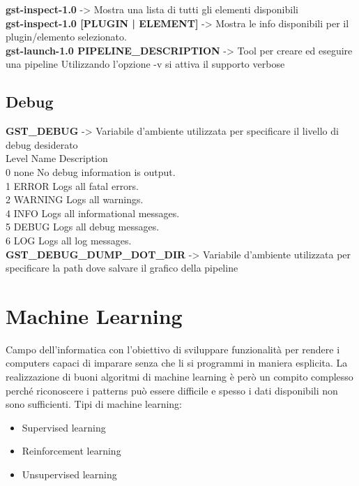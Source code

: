 \documentclass[8pt,a4paper]{article}
\begin{document}
\begin{multicols}{5}
    \textbf{gst-inspect-1.0} -> Mostra una lista di tutti gli elementi disponibili\\
    
    \textbf{gst-inspect-1.0 [PLUGIN | ELEMENT]} -> Mostra le info disponibili per il plugin/elemento selezionato.\\
    
    \textbf{gst-launch-1.0 PIPELINE\_DESCRIPTION} -> Tool per creare ed eseguire una pipeline
    Utilizzando l’opzione -v si attiva il supporto verbose\\
    
    \subsection{Debug} 
    
    \textbf{GST\_DEBUG} -> Variabile d’ambiente utilizzata per specificare il livello di debug desiderato\\
    
    Level 	Name 	Description\\
    0       none	No debug information is output.\\
    1       ERROR Logs all fatal errors.\\
    2       WARNING Logs all warnings.\\
    4       INFO 	Logs all informational messages.\\
    5       DEBUG Logs all debug messages.\\
    6       LOG   Logs all log messages.\\
    
    \textbf{GST\_DEBUG\_DUMP\_DOT\_DIR} ->  Variabile d’ambiente utilizzata per specificare la path dove salvare il grafico della pipeline
    

    \section{Machine Learning}
    Campo dell'informatica con l'obiettivo di sviluppare funzionalità per rendere
    i computers capaci di imparare senza che li si programmi in maniera esplicita.
    La realizzazione di buoni algoritmi di machine learning è però un compito complesso
    perché riconoscere i patterns può essere difficile e spesso i dati disponibili
    non sono sufficienti.
    Tipi di machine learning:
    \begin{itemize}
    \item Supervised learning
    \item Reinforcement learning
    \item Unsupervised learning
    \end{itemize}
    

\end{multicols}
\end{document}

